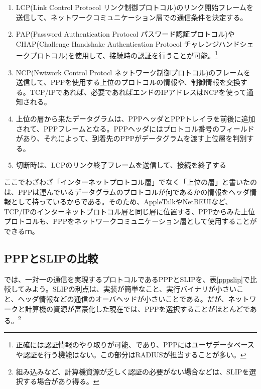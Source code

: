 \begin{enumerate}
\item LCP(Link Control Protocol リンク制御プロトコル)のリンク開始フレームを送信して、ネットワークコミュニケーション層での通信条件を決定する。
\item PAP(Password Authentication Protocol パスワード認証プロトコル)やCHAP(Challenge Handshake Authentication Protocol チャレンジハンドシェークプロトコル)を使用して、接続時の認証を行うことが可能。\footnote{正確には認証情報のやり取りが可能、であり、PPPにはユーザデータベースや認証を行う機能はない。この部分はRADIUSが担当することが多い。}
\item NCP(Nwtwork Control Protocl ネットワーク制御プロトコル)のフレームを送信して、PPPを使用する上位のプロトコルの情報や、制御情報を交換する。TCP/IPであれば、必要であればエンドのIPアドレスはNCPを使って通知される。
\item 上位の層から来たデータグラムは、PPPヘッダとPPPトレイラを前後に追加されて、PPPフレームとなる。PPPヘッダにはプロトコル番号のフィールドがあり、それによって、到着先のPPPがデータグラムを渡す上位層を判別する。
\item 切断時は、LCPのリンク終了フレームを送信して、接続を終了する
\end{enumerate}

ここでわざわざ「インターネットプロトコル層」でなく「上位の層」と書いたのは、PPPは運んでいるデータグラムのプロトコルが何であるかの情報をヘッダ情報として持っているからである。そのため、AppleTalkやNetBEUIなど、TCP/IPのインターネットプロトコル層と同じ層に位置する、PPPからみた上位プロトコルも、PPPをネットワークコミュニケーション層として使用することができるｍ。

\subsection{PPPとSLIPの比較}

では、一対一の通信を実現するプロトコルであるPPPとSLIPを、表\ref{pppslip}で比較してみよう。SLIPの利点は、実装が簡単なこと、実行バイナリが小さいこと、ヘッダ情報などの通信のオーバヘッドが小さいことである。だが、ネットワークと計算機の資源が富豪化した現在では、PPPを選択することがほとんどである。\footnote{組み込みなど、計算機資源が乏しく認証の必要がない場合などは、SLIPを選択する場合があり得る。}

